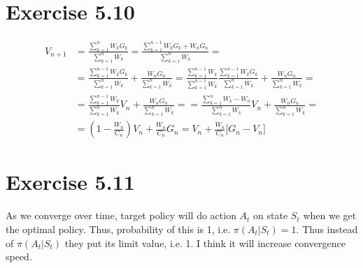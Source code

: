 \documentclass[12pt]{article}
\begin{document}
    \section{Exercise 5.10}
        \begin{align*}
            V_{n+1} &= \frac{\sum\limits_{k=1}^{n}W_k G_k}{\sum\limits_{k=1}^{n}W_k}
            = \frac{\sum\limits_{k=1}^{n - 1}W_k G_k + W_n G_n}{\sum\limits_{k=1}^{n}W_k} =\\
            & = \frac{\sum\limits_{k=1}^{n - 1}W_k G_k}{\sum\limits_{k=1}^{n}W_k} + \frac{W_n G_n}{\sum\limits_{k=1}^{n}W_k}
            = \frac{\sum\limits_{k=1}^{n-1}W_k}{\sum\limits_{k=1}^{n - 1}W_k}
            \frac{\sum\limits_{k=1}^{n - 1}W_k G_k}{\sum\limits_{k=1}^{n}W_k} +
            \frac{W_n G_n}{\sum\limits_{k=1}^{n}W_k} =\\
            & = \frac{\sum\limits_{k=1}^{n-1}W_k}{\sum\limits_{k=1}^{n}W_k}
            V_n + \frac{W_n G_n}{\sum\limits_{k=1}^{n}W_k} =
            = \frac{\sum\limits_{k=1}^{n}W_k - W_n}{\sum\limits_{k=1}^{n}W_k}
            V_n + \frac{W_n G_n}{\sum\limits_{k=1}^{n}W_k} =\\
            & = (1 - \frac{W_n}{C_n})V_n + \frac{W_n}{C_n}G_n
            = V_n + \frac{W_n}{C_n} \Big[G_n - V_n\Big]
        \end{align*}

    \section{Exercise 5.11}
        As we converge over time, target policy will do action $A_t$ on state
        $S_t$ when we get the optimal policy. Thus, probability of this is 1,
        i.e. $\pi(A_t|S_t) = 1$. Thus instead of $\pi(A_t|S_t)$ they put its
        limit value, i.e. 1. I think it will increase convergence speed.
\end{document}
